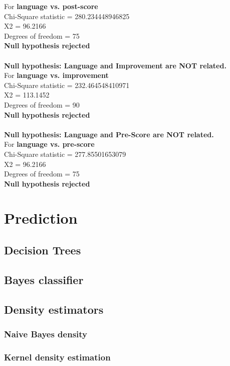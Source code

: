 \documentclass[10pt]{article}
\begin{document}
 For \textbf{language vs. post-score}\\
 Chi-Square statistic = 280.234448946825\\
 X2 = 96.2166\\
 Degrees of freedom = 75\\
 \textbf{Null hypothesis rejected}\\
\\
\textbf{Null hypothesis: Language and Improvement are NOT related.}\\
 For \textbf{language vs. improvement}\\
 Chi-Square statistic = 232.464548410971\\
 X2 = 113.1452\\
 Degrees of freedom = 90\\
 \textbf{Null hypothesis rejected}\\
\\
\textbf{Null hypothesis: Language and Pre-Score are NOT related.}\\
 For \textbf{language vs. pre-score}\\
 Chi-Square statistic = 277.85501653079\\
 X2 = 96.2166\\
 Degrees of freedom = 75\\
 \textbf{Null hypothesis rejected}\\

\newpage
\section{Prediction}
\newpage
\subsection{Decision Trees}
\newpage
\subsection{Bayes classifier}
\newpage
\subsection{Density estimators}
\subsubsection{Naive Bayes density}
\subsubsection{Kernel density estimation}
\end{document}
